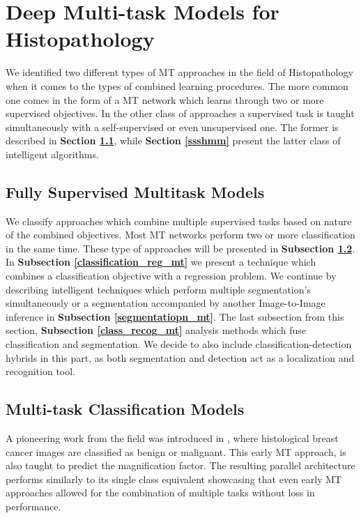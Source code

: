 \chapter{Deep Multi-task Models for Histopathology}
\label{chapter:InvestigatedApproach}

We identified two different types of MT approaches in the field of Histopathology when it comes to the types of combined learning procedures. The more common one comes in the form of a MT network which learns through two or more supervised objectives. In the other class of approaches a supervised task is taught simultaneously with a self-supervised or even unsupervised one. The former is described in \textbf{Section \ref{hsmm}}, while \textbf{Section \ref{ssshmm}} present the latter class of intelligent algorithms.

\section{Fully Supervised
Multitask Models}
\label{hsmm}

We classify approaches which combine multiple supervised tasks based on nature of the combined objectives. Most MT networks perform two or more classification in the same time. These type of approaches will be presented in \textbf{Subsection \ref{classification_mt}}. In \textbf{Subsection \ref{classification_reg_mt}} we present a technique which combines a classification objective with a regression problem. We continue by describing intelligent techniques which perform multiple segmentation's simultaneously or a segmentation accompanied by another Image-to-Image inference in \textbf{Subsection \ref{segmentatiopn_mt}}. The last subsection from this section, \textbf{Subsection \ref{class_recog_mt}} analysis methods which fuse classification and segmentation. We decide to also include classification-detection hybrids in this part, as both segmentation and detection act as a localization and recognition tool.

\section{Multi-task Classification Models}
\label{classification_mt}
A pioneering work from the field  was introduced in \cite{bayramoglu2016deep}, where histological breast cancer images are classified as benign or malignant. This early MT approach, is also taught to predict the magnification factor. The resulting parallel architecture performs similarly to its single class equivalent showcasing that even early MT approaches allowed for the combination of multiple tasks without loss in performance. 

